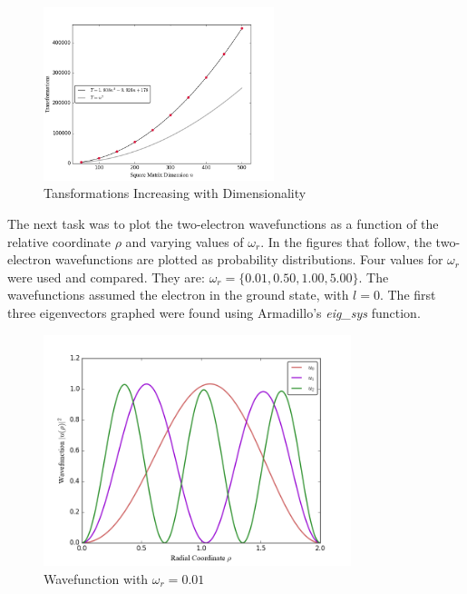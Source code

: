 \documentclass[11pt]{article}
\begin{document}
    \begin{figure}[H] \begin{center}
    \includegraphics[width=0.6\textwidth]{../Code/TvsN.png}
    \end{center} \caption{Tansformations Increasing with Dimensionality} \end{figure}

    The next task was to plot the two-electron wavefunctions as a function of the relative coordinate $\rho$ and varying values of $\omega_r$. In the figures that follow, the two-electron wavefunctions are plotted as probability distributions. Four values for $\omega_r$ were used and compared. They are: $\omega_r = \{ 0.01 , 0.50 , 1.00 , 5.00 \}$. The wavefunctions assumed the electron in the ground state, with $l = 0$. The first three eigenvectors graphed were found using Armadillo's {\em eig\_sys} function.

    \begin{figure}[H] \begin{center}
    \includegraphics[width=0.8\textwidth]{../Code/WavefunctionOmega0p01.png}
    \end{center} \caption{Wavefunction with $\omega_r = 0.01$} \end{figure}
\end{document}

